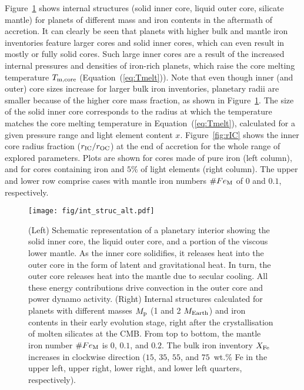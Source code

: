 \documentclass[draft]{agujournal2019} %
\begin{document}
Figure~\ref{fig:rIC_sketch} shows internal structures (solid inner core, liquid outer core, silicate mantle) for planets of different mass and iron contents in the aftermath of accretion. It can clearly be seen that planets with higher bulk and mantle iron inventories feature larger cores and solid inner cores, which can even result in mostly or fully solid cores. Such large inner cores are a result of the increased internal pressures and densities of iron-rich planets, which raise the core melting temperature $T_{\rm m, core}$ (Equation~(\ref{eq:Tmelt})). Note that even though inner (and outer) core sizes increase for larger bulk iron inventories, planetary radii are smaller because of the higher core mass fraction, as shown in Figure~\ref{fig:rIC_sketch}. The size of the solid inner core corresponds to the radius at which the temperature matches the core melting temperature in Equation~(\ref{eq:Tmelt}), calculated for a given pressure range and light element content $x$. Figure~\ref{fig:rIC} shows the inner core radius fraction ($r_{\rm IC}/r_{\rm OC}$) at the end of accretion for the whole range of explored parameters. Plots are shown for cores made of pure iron (left column), and for cores containing iron and $5\%$ of light elements (right column). The upper and lower row comprise cases with mantle iron numbers $\# Fe_{\rm M}$ of $0$ and $0.1$, respectively.

\begin{figure}[t]
\texttt{[image: fig/int\_struc\_alt.pdf]}
\caption{(Left) Schematic representation of a planetary interior showing the solid inner core, the liquid outer core, and a portion of the viscous lower mantle. As the inner core solidifies, it releases heat into the outer core in the form of latent and gravitational heat. In turn, the outer core releases heat into the mantle due to secular cooling. All these energy contributions drive convection in the outer core and power dynamo activity.
(Right) Internal structures calculated for planets with different masses $M_{\rm p}$ (1 and 2 $M_{\rm Earth}$) and iron contents in their early evolution stage, right after the crystallisation of molten silicates at the CMB. From top to bottom, the mantle iron number $\# Fe_{\rm M}$ is $0$, $0.1$, and $0.2$. The bulk iron inventory $X_{\rm Fe}$ increases in clockwise direction ($15$, $35$, $55$, and $75$~wt.\% Fe in the upper left, upper right, lower right, and lower left quarters, respectively).}
\label{fig:rIC_sketch}
\end{figure}
\end{document}
